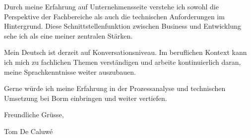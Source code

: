 \documentclass[12pt,a4paper]{letter}
\begin{document}
Durch meine Erfahrung auf Unternehmensseite verstehe ich sowohl die Perspektive der Fachbereiche als auch die technischen Anforderungen im Hintergrund. Diese Schnittstellenfunktion zwischen Business und Entwicklung sehe ich als eine meiner zentralen Stärken.

Mein Deutsch ist derzeit auf Konversationsniveau. Im beruflichen Kontext kann ich mich zu fachlichen Themen verständigen und arbeite kontinuierlich daran, meine Sprachkenntnisse weiter auszubauen.

Gerne würde ich meine Erfahrung in der Prozessanalyse und technischen Umsetzung bei Borm einbringen und weiter vertiefen.

Freundliche Grüsse,

Tom De Caluwé


\end{document}
